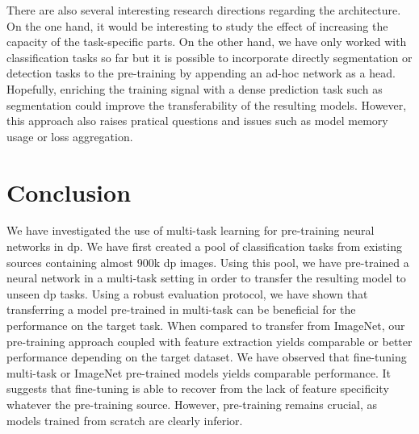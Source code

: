 There are also several interesting research directions regarding the architecture. On the one hand, it would be interesting to study the effect of increasing the capacity of the task-specific parts. On the other hand, we have only worked with classification tasks so far but it is possible to incorporate directly segmentation or detection tasks to the pre-training by appending an ad-hoc network as a head. Hopefully, enriching the training signal with a dense prediction task such as segmentation could improve the transferability of the resulting models. However, this approach also raises pratical questions and issues such as model memory usage or loss aggregation. 

\section{Conclusion}

We have investigated the use of multi-task learning for pre-training neural networks in \acrlong{dp}. We have first created a pool of classification tasks from existing sources containing almost 900k \acrlong{dp} images. Using this pool, we have pre-trained a neural network in a multi-task setting in order to transfer the resulting model to unseen \acrlong{dp} tasks. Using a robust evaluation protocol, we have shown that transferring a model pre-trained in multi-task can be beneficial for the performance on the target task. When compared to transfer from ImageNet, our pre-training approach coupled with feature extraction yields comparable or better performance depending on the target dataset. We have observed that fine-tuning multi-task or ImageNet pre-trained models yields comparable performance. It suggests that fine-tuning is able to recover from the lack of feature specificity whatever the pre-training source. However, pre-training remains crucial, as models trained from scratch are clearly inferior. 

